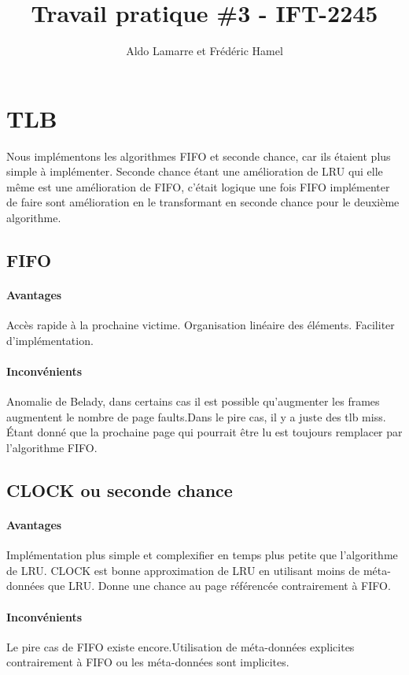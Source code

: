 \documentclass{article}
\title{Travail pratique \#3 - IFT-2245}
\author{Aldo Lamarre et Frédéric Hamel }
\begin{document}
\maketitle


\section*{TLB}
Nous implémentons les algorithmes FIFO et seconde chance, car ils étaient plus 
simple à implémenter. Seconde chance étant une amélioration de LRU qui elle 
même est une amélioration de FIFO, c'était logique une fois FIFO implémenter 
de faire sont amélioration en le transformant en seconde chance pour le 
deuxième algorithme.
\subsection{FIFO}
\paragraph{Avantages}
Accès rapide à la prochaine victime.
Organisation linéaire des éléments.
Faciliter d'implémentation. 

\paragraph{Inconvénients}
Anomalie de Belady, dans certains cas il est possible qu'augmenter les frames 
augmentent le nombre de page faults.Dans le pire cas, il y a juste des tlb miss.
Étant donné que la prochaine page qui pourrait être lu est toujours remplacer 
par l'algorithme FIFO. 

\subsection{CLOCK ou seconde chance}
\paragraph{Avantages}
Implémentation plus simple et complexifier en temps plus petite que l'algorithme de LRU.
CLOCK est bonne approximation de LRU en utilisant moins de méta-données que LRU.
Donne une chance au page référencée contrairement à FIFO.

\paragraph{Inconvénients}
Le pire cas de FIFO existe encore.Utilisation de méta-données explicites contrairement
 à FIFO ou les méta-données sont implicites. 


\section*{}

\section*{}
\end{document}
